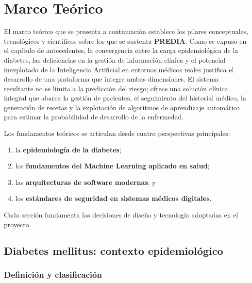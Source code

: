 \documentclass[12pt, letterpaper, twoside]{report}
\begin{document}
\chapter{Marco Teórico}

El marco teórico que se presenta a continuación establece los pilares conceptuales, tecnológicos y científicos sobre los que se sustenta \textbf{PREDIA}. Como se expuso en el capítulo de antecedentes, la convergencia entre la carga epidemiológica de la diabetes, las deficiencias en la gestión de información clínica y el potencial inexplotado de la Inteligencia Artificial en entornos médicos reales justifica el desarrollo de una plataforma que integre ambas dimensiones. El sistema resultante no se limita a la predicción del riesgo; ofrece una solución clínica integral que abarca la gestión de pacientes, el seguimiento del historial médico, la generación de recetas y la explotación de algoritmos de aprendizaje automático para estimar la probabilidad de desarrollo de la enfermedad.

Los fundamentos teóricos se articulan desde cuatro perspectivas principales:
\begin{enumerate}[leftmargin=2cm]
  \item la \textbf{epidemiología de la diabetes};
  \item los \textbf{fundamentos del Machine Learning aplicado en salud};
  \item las \textbf{arquitecturas de software modernas}; y
  \item los \textbf{estándares de seguridad en sistemas médicos digitales}.
\end{enumerate}
Cada sección fundamenta las decisiones de diseño y tecnología adoptadas en el proyecto.

\section{Diabetes mellitus: contexto epidemiológico}

\subsection{Definición y clasificación}
\end{document}
